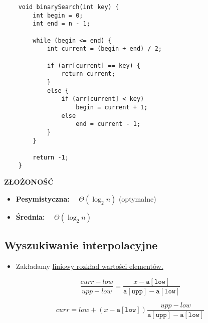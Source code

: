 \documentclass[search-algorithms.tex]{subfiles}
\begin{document}
    \begin{verbatim}
    void binarySearch(int key) {
        int begin = 0;
        int end = n - 1;

        while (begin <= end) {
            int current = (begin + end) / 2;

            if (arr[current] == key) {
                return current;
            }
            else {
                if (arr[current] < key)
                    begin = current + 1;
                else
                    end = current - 1;
            }
        }

        return -1;
    }
    \end{verbatim}

    \textbf{ZŁOŻONOŚĆ}
    \begin{itemize}
        \item \textbf{Pesymistyczna:} ~~$\Theta(\log_2 n)$ (optymalne)
        \item \textbf{Średnia:} ~~$\Theta(\log_2 n)$
    \end{itemize}


    \subsection{Wyszukiwanie interpolacyjne}
    \begin{itemize}
        \item Zakładamy \underline{liniowy rozkład wartości elementów.}
    \end{itemize}

    \begin{equation*}
        \frac{curr - low}{upp - low} =
        \frac{x - \mathtt{a[low]}}{\mathtt{a[upp]} - \mathtt{a[low]}}
    \end{equation*}

    \begin{equation*}
        curr = low + (x - \mathtt{a[low]})
        \frac{upp - low}{\mathtt{a[upp]} - \mathtt{a[low]}}
    \end{equation*}

\end{document}
